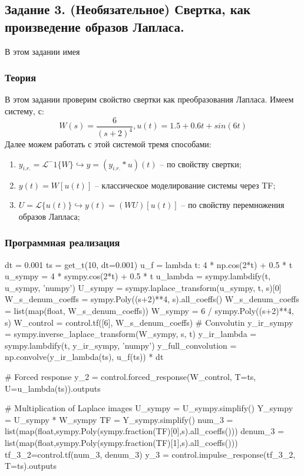 \documentclass[16pt]{article}
\begin{document}
\pagebreak
\subsection{Задание 3. (Необязательное) Свертка, как произведение образов Лапласа.}
В этом задании имея 
\subsubsection{Теория}
В этом задании проверим свойство свертки как преобразования Лапласа. Имеем систему, с:
\[
    W(s) = \frac{6}{(s+2)^4}, u(t) = 1.5 + 0.6t + sin(6t)
\]
Далее можем работать с этой системой тремя способами:
\begin{enumerate}
\item \(y_{i.r.} = \mathscr{L}^-1\{W\} \hookrightarrow y = (y_{i.r.} * u)(t)\) -- по свойству свертки;
\item \(y(t) = W[u(t)]\) -- классическое моделирование системы через TF;
\item \(U = \mathscr{L}\{u(t)\} \hookrightarrow y(t) = (WU)[u(t)]\) -- по свойству перемножения образов Лапласа;
\end{enumerate}


\subsubsection{Программная реализация}
\begin{python}
dt = 0.001
ts = get_t(10, dt=0.001)
u_f = lambda t: 4 * np.cos(2*t) +  0.5 * t
u_sympy = 4 * sympy.cos(2*t) + 0.5 * t
u_lambda = sympy.lambdify(t, u_sympy, 'numpy')
U_sympy = sympy.laplace_transform(u_sympy, t, s)[0]
W_s_denum_coeffs = sympy.Poly((s+2)**4, s).all_coeffs()
W_s_denum_coeffs = list(map(float, W_s_denum_coeffs))
W_sympy = 6 / sympy.Poly((s+2)**4, s)
W_control = control.tf([6], W_s_denum_coeffs)
#  Convolutin
y_ir_sympy = sympy.inverse_laplace_transform(W_sympy, s, t)
y_ir_lambda = sympy.lambdify(t, y_ir_sympy, 'numpy')
y_full_convolution = np.convolve(y_ir_lambda(ts), u_f(ts)) * dt

#  Forced response
y_2 = control.forced_response(W_control, T=ts, U=u_lambda(ts)).outputs

#  Multiplication of Laplace images
U_sympy = U_sympy.simplify()
Y_sympy = U_sympy * W_sympy 
TF = Y_sympy.simplify()
num_3 = list(map(float,sympy.Poly(sympy.fraction(TF)[0],s).all_coeffs()))
denum_3 = list(map(float,sympy.Poly(sympy.fraction(TF)[1],s).all_coeffs()))
tf_3_2=control.tf(num_3, denum_3)
y_3 = control.impulse_response(tf_3_2, T=ts).outputs
\end{python}
\end{document}
